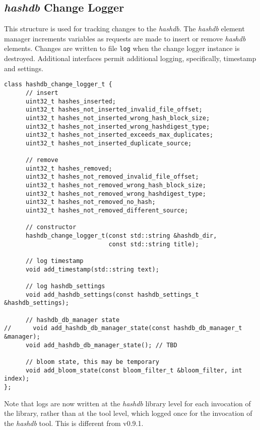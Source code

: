 \documentclass[12pt,twoside]{article}
\newcommand{\hdb}{\emph{hashdb}\xspace}
\begin{document}
\subsection{\hdb Change Logger}
This structure is used for tracking changes to the \hdb.
The \hdb element manager increments variables
as requests are made to insert or remove \hdb elements.
Changes are written to file \texttt{log}
when the change logger instance is destroyed.
Additional interfaces permit additional logging,
specifically, timestamp and settings.

\begin{small}
\begin{verbatim}
class hashdb_change_logger_t {
      // insert
      uint32_t hashes_inserted;
      uint32_t hashes_not_inserted_invalid_file_offset;
      uint32_t hashes_not_inserted_wrong_hash_block_size;
      uint32_t hashes_not_inserted_wrong_hashdigest_type;
      uint32_t hashes_not_inserted_exceeds_max_duplicates;
      uint32_t hashes_not_inserted_duplicate_source;

      // remove
      uint32_t hashes_removed;
      uint32_t hashes_not_removed_invalid_file_offset;
      uint32_t hashes_not_removed_wrong_hash_block_size;
      uint32_t hashes_not_removed_wrong_hashdigest_type;
      uint32_t hashes_not_removed_no_hash;
      uint32_t hashes_not_removed_different_source;

      // constructor
      hashdb_change_logger_t(const std::string &hashdb_dir,
                             const std::string title);

      // log timestamp
      void add_timestamp(std::string text);

      // log hashdb_settings
      void add_hashdb_settings(const hashdb_settings_t &hashdb_settings);

      // hashdb_db_manager state
//      void add_hashdb_db_manager_state(const hashdb_db_manager_t &manager);
      void add_hashdb_db_manager_state(); // TBD

      // bloom state, this may be temporary
      void add_bloom_state(const bloom_filter_t &bloom_filter, int index);
};
\end{verbatim}
\end{small}

Note that logs are now written at the \hdb library level
for each invocation of the library,
rather than at the tool level, which logged once
for the invocation of the \hdb tool.
This is different from v0.9.1.

\end{document}
